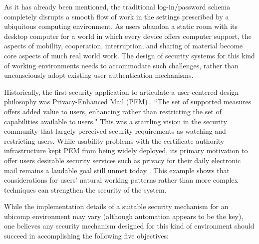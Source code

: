 \documentclass{article}
\begin{document}
As it has already been mentioned, the traditional log-in/password schema completely disrupts a smooth flow of work in the settings prescribed by a ubiquitous computing environment. As users abandon a static room with its desktop computer for a world in which every device offers computer support, the aspects of mobility, cooperation, interruption, and sharing of material become core aspects of much real world work. The design of security systems for this kind of working environments needs to accommodate such challenges, rather than unconsciously adopt existing user authentication mechanisms.

Historically, the first security application to articulate a user-centered design philosophy was Privacy-Enhanced Mail (PEM) \cite{linn1993privacy}. ``The set of supported measures offers added value to users, enhancing rather than restricting the set of capabilities available to users." This was a startling vision in the security community that largely perceived security requirements as watching and restricting users. While usability problems with the certificate authority infrastructure kept PEM from being widely deployed, its primary motivation to offer users desirable security services such as privacy for their daily electronic mail remains a laudable goal still  unmet today \cite{zurko1996user}.  This example shows that considerations for users' natural working patterns rather than more complex techniques can strengthen the security of the system.

While the implementation details of a suitable security mechanism for an ubicomp environment may vary (although automation appears to be the key), one believes any security mechanism designed for this kind of environment should succeed in accomplishing the following five objectives:
\end{document}

